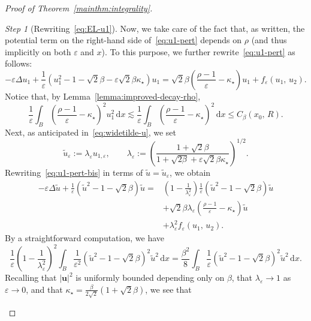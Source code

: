 \documentclass[a4paper, 11pt, twoside, leqno]{article}
\theoremstyle{definition}              %
\theoremstyle{remark}                  %
\newtheorem{step}{Step}
\newcommand{\abs}[1]{\left| #1 \right|}                             %
\renewcommand{\d}{\mathrm{d}}
\renewcommand{\u}{\mathbf{u}}
\newcommand{\eps}{\varepsilon}
\begin{document}
\begin{proof}[{Proof of Theorem~\ref{mainthm:integrality}}]
\begin{step}[Rewriting~\eqref{eq:EL-u1}]
	Now, we take care of the fact that, as written, the potential term 
	on the right-hand side of~\eqref{eq:u1-pert} depends on $\rho$ 
	(and thus implicitly on both $\eps$ and $x$). To this purpose,
	we further rewrite~\eqref{eq:u1-pert} as follows:
    \begin{equation}\label{eq:u1-pert-bis}
    -\eps \Delta u_1 + \frac{1}{\eps}\left(u_1^2 - 1 - \sqrt{2}\beta - \eps \sqrt{2}\beta \kappa_\star \right)u_1 
    = \sqrt{2}\beta \left( \frac{\rho-1}{\eps} - \kappa_\star \right) u_1 + f_\eps(u_1,\,u_2).
	\end{equation}
	Notice that, by Lemma~\ref{lemma:improved-decay-rho}, 
	\begin{equation}\label{eq:decay-rho-pot}
   \frac{1}{\eps} \int_B \left( \frac{\rho-1}{\eps} - \kappa_\star \right)^2 u_1^2 \,{\d}x \lesssim 
   \frac{1}{\eps} \int_B \left( \frac{\rho-1}{\eps} - \kappa_\star \right)^2 \,{\d}x
   \leq C_\beta(x_0,\,R).
	\end{equation}
	Next, as anticipated in~\eqref{eq:widetilde-u}, we set 
	\[
		\widetilde{u}_\eps := \lambda_\eps u_{1,\eps}, 
		\qquad
		\lambda_\eps := \left(\frac{1 + \sqrt{2}\beta}{1+\sqrt{2\beta} + \eps \sqrt{2}\beta \kappa_\star}\right)^{1/2}.
	\]
	Rewriting~\eqref{eq:u1-pert-bis} in terms of $\widetilde{u} = \widetilde{u}_\eps$, 
    we obtain
    \begin{equation}\label{eq:u1-pert-ter}
    \begin{split}
    -\eps \Delta \widetilde{u} + \frac{1}{\eps}\left(\widetilde{u}^2 - 1 - \sqrt{2}\beta \right)\widetilde{u} = &\left( 1- \frac{1}{\lambda_\eps^2} \right)\frac{1}{\eps}\left(\widetilde{u}^2 - 1 - \sqrt{2}\beta \right)\widetilde{u} \\
    &+ \sqrt{2}\beta \lambda_\eps \left( \frac{\rho-1}{\eps} - \kappa_\star \right) \widetilde{u} \\
    &+ \lambda_\eps^2 f_\eps(u_1,\,u_2).
    \end{split}
	\end{equation}
	By a straightforward computation, we have
	\[
		\frac{1}{\eps} \left( 1- \frac{1}{\lambda_\eps^2} \right)^2 \int_B \frac{1}{\eps^2}\left(\widetilde{u}^2 - 1 - \sqrt{2}\beta \right)^2\widetilde{u}^2 \,{\d}x = \frac{\beta^2}{8} \int_B \frac{1}{\eps}\left(\widetilde{u}^2 - 1 - \sqrt{2}\beta \right)^2\widetilde{u}^2 \,{\d}x .
	\]	
	Recalling that $\abs{\u}^2$ is uniformly bounded depending only on $\beta$, 
	that $\lambda_\eps \to 1$ as $\eps \to 0$, and that $\kappa_\star = \frac{\beta}{2\sqrt{2}}\left( 1 + \sqrt{2}\beta \right)$, 
	we see that

\end{step}
\end{proof}
\end{document}
